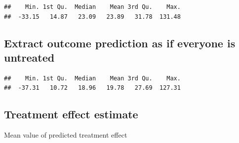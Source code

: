\documentclass[
]{book}
\newenvironment{Shaded}{\begin{snugshade}}{\end{snugshade}}
\newcommand{\AttributeTok}[1]{\textcolor[rgb]{0.77,0.63,0.00}{#1}}
\newcommand{\DecValTok}[1]{\textcolor[rgb]{0.00,0.00,0.81}{#1}}
\newcommand{\FunctionTok}[1]{\textcolor[rgb]{0.00,0.00,0.00}{#1}}
\newcommand{\NormalTok}[1]{#1}
\newcommand{\OtherTok}[1]{\textcolor[rgb]{0.56,0.35,0.01}{#1}}
\newcommand{\SpecialCharTok}[1]{\textcolor[rgb]{0.00,0.00,0.00}{#1}}
\newcommand{\StringTok}[1]{\textcolor[rgb]{0.31,0.60,0.02}{#1}}
\begin{document}
\begin{verbatim}
##    Min. 1st Qu.  Median    Mean 3rd Qu.    Max. 
##  -33.15   14.87   23.09   23.89   31.78  131.48
\end{verbatim}

\hypertarget{extract-outcome-prediction-as-if-everyone-is-untreated}{%
\subsection{Extract outcome prediction as if everyone is untreated}\label{extract-outcome-prediction-as-if-everyone-is-untreated}}

\begin{Shaded}
\end{Shaded}

\begin{verbatim}
##    Min. 1st Qu.  Median    Mean 3rd Qu.    Max. 
##  -37.31   10.72   18.96   19.78   27.69  127.31
\end{verbatim}

\hypertarget{treatment-effect-estimate-1}{%
\subsection{Treatment effect estimate}\label{treatment-effect-estimate-1}}

\begin{Shaded}
\end{Shaded}

Mean value of predicted treatment effect

\begin{Shaded}
\end{Shaded}
\end{document}

